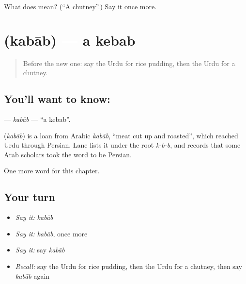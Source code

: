 \begin{tcolorbox}[breakable,colback=teal!4,colframe=teal!35!black,title={Before you move on}]
What does  mean? (\textquotedblleft{}A chutney\textquotedblright{}.) Say it once more.
\end{tcolorbox}
\section[\texorpdfstring{\ur{کباب} (kabāb)}{کباب (kabāb)}]{ (kabāb) — a kebab}

\label{lesson:UR-C120-kabab}



\begin{quote}
Before the new one: say the Urdu for rice pudding, then the Urdu for a chutney.
\end{quote}

\subsection*{You'll want to know: }
\textbf{} — \emph{kabāb} — \textquotedblleft{}a kebab\textquotedblright{}.

\begin{cousinweb}
\textbf{} (\emph{kabāb}) is a loan from Arabic \emph{kabāb}, \textquotedblleft{}meat cut up and roasted\textquotedblright{}, which reached Urdu through Persian. Lane lists it under the root \emph{k-b-b}, and records that some Arab scholars took the word to be Persian.
\end{cousinweb}

\begin{grammarlens}[title={What you've built}]
One more word for this chapter.
\end{grammarlens}

\subsection*{Your turn}
\begin{itemize}
\raggedright
  \item \emph{Say it:} \emph{kabāb}
  \item \emph{Say it:} \emph{kabāb}, once more
  \item \emph{Say it:} say \emph{kabāb}
  \item \emph{Recall:} say the Urdu for rice pudding, then the Urdu for a chutney, then say \emph{kabāb} again
\end{itemize}

